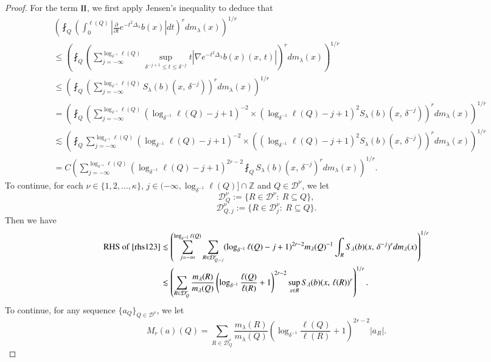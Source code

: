 \documentclass[12pt]{amsart}
\begin{document}
\begin{proof}
For the term ${\rm II}$, we first apply Jensen's inequality to deduce that
\begin{align}\label{rhs123}
&\left(\fint_Q \left(\int_0^{\ell(Q)}\left|\frac{\partial}{\partial t}e^{-t^2 \Delta_\lambda }b(x)\right|dt\right)^rdm_\lambda(x)\right)^{1/r}\nonumber\\
&\leq  \left(\fint_Q \left(\sum_{j=-\infty}^{\log_{\delta^{-1}}\ell(Q)}\sup\limits_{\delta^{-j+1}\leq t\leq \delta^{-j}}t|\nabla e^{-t^2 \Delta_\lambda }b(x)(x,\,t)| \right)^rdm_\lambda(x)\right)^{1/r} \nonumber\\
&\leq  \left(\fint_Q \left(\sum_{j=-\infty}^{\log_{\delta^{-1}}\ell(Q)}S_\lambda(b)(x,\,\delta^{-j}) \right)^rdm_\lambda(x)\right)^{1/r} \nonumber\\
&=  \left(\fint_Q \left(\sum_{j=-\infty}^{\log_{\delta^{-1}}\ell(Q)}(\log_{\delta^{-1}}\ell(Q)-j+1)^{-2}\times (\log_{\delta^{-1}}\ell(Q)-j+1)^2S_\lambda(b)(x,\,\delta^{-j}) \right)^rdm_\lambda(x)\right)^{1/r} \nonumber\\
&\lesssim  \left(\fint_Q \sum_{j=-\infty}^{\log_{\delta^{-1}}\ell(Q)}(\log_{\delta^{-1}}\ell(Q)-j+1)^{-2}\times \left( (\log_{\delta^{-1}}\ell(Q)-j+1)^2S_\lambda(b)(x,\,\delta^{-j}) \right)^rdm_\lambda(x)\right)^{1/r} \nonumber\\
&=C\left(\sum_{j=-\infty}^{\log_{\delta^{-1}}\ell(Q)}(\log_{\delta^{-1}}\ell(Q)-j+1)^{2r-2}\fint_QS_\lambda(b)(x,\,\delta^{-j})^rdm_\lambda(x) \right)^{1/r}.
\end{align}
To continue, for each $\nu\in\{1,2,\ldots ,\kappa\}$, $j\in (-\infty,\log_{\delta^{-1}}\ell(Q)]\cap\mathbb{Z}$ and $Q\in\mathcal{D}^\nu$, we let
$$\mathcal{D}_Q^\nu:=\{R\in\mathcal{D}^\nu:\ R\subseteq Q\},$$
$$\mathcal{D}_{Q,j}^\nu:=\{R\in\mathcal{D}_j^\nu:\ R\subseteq Q\}.$$
Then we have
\begin{align}\label{backo}
{\rm RHS}\ {\rm of}\ \eqref{rhs123}
&\lesssim\left(\sum_{j=-\infty}^{\log_{\delta^{-1}}\ell(Q)}\sum_{R\in\mathcal{D}_{Q,-j}^\nu}(\log_{\delta^{-1}}\ell(Q)-j+1)^{2r-2}m_\lambda(Q)^{-1}\int_{R}S_\lambda(b)(x,\,\delta^{-j})^rdm_\lambda(x) \right)^{1/r}\nonumber\\
&\lesssim\left(\sum_{R\in\mathcal{D}_{Q}^\nu}\frac{m_\lambda(R)}{m_\lambda(Q)}\left(\log_{\delta^{-1}}\frac{\ell(Q)}{\ell(R)}+1\right)^{2r-2}\sup\limits_{x\in R}S_\lambda(b)(x,\,\ell(R))^r \right)^{1/r}.
\end{align}
To continue, for any sequence $\{a_Q\}_{Q\in\mathcal{D}^\nu}$, we let
$$M_r(a)(Q)=\sum_{R\in\mathcal{D}_{Q}^\nu}\frac{m_\lambda(R)}{m_\lambda(Q)}\left(\log_{\delta^{-1}}\frac{\ell(Q)}{\ell(R)}+1\right)^{2r-2}|a_R|.$$

\end{proof}
\end{document}
